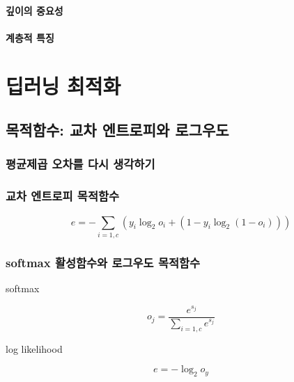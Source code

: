 \documentclass [12pt] {oblivoir}
\let\oldsubsubsection=\subsubsection
\renewcommand{\subsubsection}
{
  \filbreak
  \oldsubsubsection
}
\begin{document}
\vspace{3mm}

\paragraph*{깊이의 중요성}\mbox{}

\vspace{3mm}

\paragraph*{계층적 특징}\mbox{}

\vspace{3mm}

\newpage
\section{딥러닝 최적화}

\subsection{목적함수: 교차 엔트로피와 로그우도}

\subsubsection{평균제곱 오차를 다시 생각하기}

\subsubsection{교차 엔트로피 목적함수}

\begin{equation} \tag{5.6}
  e = -\sum_{i=1,c}(y_{i}\log_{2}o_{i} + (1 - y_{i}\log_{2}(1 - o_{i})))
\end{equation}

\subsubsection{softmax 활성함수와 로그우도 목적함수}

softmax

\begin{equation} \tag{5.7}
  o_{j}= \frac{e^{s_{j}}}{\sum_{i=1,c}e^{s_{j}}}
\end{equation}

log likelihood

\begin{equation} \tag{5.8}
  e = -\log_{2}o_{y}
\end{equation}
\end{document}
